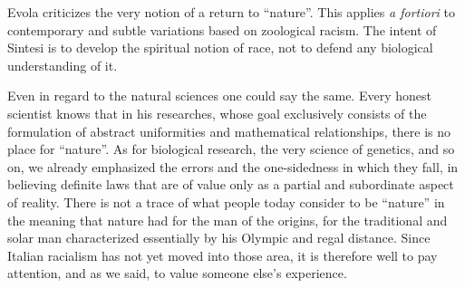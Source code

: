 \begin{quotex}
Evola criticizes the very notion of a return to ``nature''. This applies \emph{a fortiori} to contemporary and subtle variations based on zoological racism. The intent of Sintesi is to develop the spiritual notion of race, not to defend any biological understanding of it.
\end{quotex}

Even in regard to the natural sciences one could say the same. Every honest scientist knows that in his researches, whose goal exclusively consists of the formulation of abstract uniformities and mathematical relationships, there is no place for ``nature''. As for biological research, the very science of genetics, and so on, we already emphasized the errors and the one-sidedness in which they fall, in believing definite laws that are of value only as a partial and subordinate aspect of reality. There is not a trace of what people today consider to be ``nature'' in the meaning that nature had for the man of the origins, for the traditional and solar man characterized essentially by his Olympic and regal distance. Since Italian racialism has not yet moved into those area, it is therefore well to pay attention, and as we said, to value someone else's experience.



